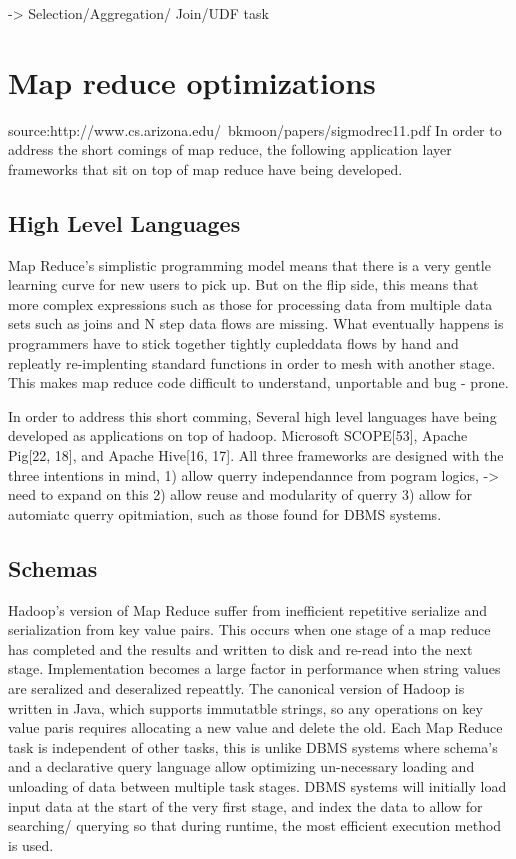 \documentclass[10pt,twocolumn]{IEEEtran11}
\begin{document}
-> Selection/Aggregation/ Join/UDF task


\section{Map reduce optimizations}

source:http://www.cs.arizona.edu/~bkmoon/papers/sigmodrec11.pdf
In order to address the short comings of map reduce, the following application layer frameworks that sit on top of map reduce have being developed.

\subsection{High Level Languages}
Map Reduce's simplistic programming model means that there is a very gentle learning curve for new users to pick up.  But on the flip side, this means that more complex expressions  such as those for processing data from multiple data sets such as joins and N step data flows are missing.  What eventually happens is programmers have to stick together tightly cupleddata flows by hand and repleatly re-implenting standard functions in order to mesh with another stage.  This makes map reduce code difficult to understand, unportable and bug - prone.  

In order to address this short comming, Several high level languages have being developed as applications on top of hadoop.  Microsoft SCOPE[53], Apache Pig[22, 18], and Apache Hive[16, 17].  All three frameworks are designed with the three intentions in mind,
1) allow querry independannce from pogram logics, -> need to expand on this
2) allow reuse and modularity of querry
3) allow for automiatc querry opitmiation, such as those found for DBMS systems.

\subsection{Schemas}
Hadoop's version of Map Reduce suffer from inefficient repetitive serialize and serialization from key value pairs.  This occurs when one stage of a map reduce has  completed and the results and written to disk and re-read into the next stage.  Implementation becomes a large factor in performance when string values are seralized and deseralized repeattly.  The canonical version of Hadoop is written in Java, which supports immutatble strings, so any operations on key value paris requires allocating a new value and delete the old.  Each Map Reduce task is independent of other tasks, this is unlike DBMS systems where schema's and a declarative query language allow optimizing un-necessary loading and unloading of data between multiple task stages.
DBMS systems will initially load input data at the start of the very first stage, and index the data to allow for searching/ querying so that during runtime, the most efficient execution method is used.
\end{document}
